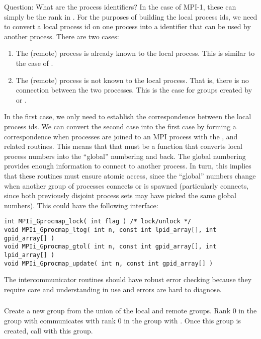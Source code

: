 \documentclass{article}
\begin{document}
Question: What are the process identifiers?  In the case of MPI-1, 
these can simply be the rank in .  For the
purposes of building the local process ids, we need to convert a local
process id on one process into a identifier that can be used by
another process.  There are two cases:
\begin{enumerate}
\item The (remote) process is already known to the local process.
This is similar to the case of .
\item The (remote) process is not known to the local process.  That
is, there is no connection between the two processes.  This is the
case for groups created by  or
. 
\end{enumerate}
In the first case, we only need to establish the correspondence
between the local process ids.  
We can convert the second case into the first case by forming a
correspondence when processes are joined to an MPI process with the
,  and related
routines.  This means that that must be a function that converts local
process numbers into the ``global'' numbering and back.  The global
numbering provides enough information to connect to another process.
In turn, this implies that these routines must ensure atomic access,
since the ``global'' numbers change when another group of processes
connects or is spawned (particularly connects, since both previously
disjoint process sets may have picked the same global numbers).
This could have the following
interface: 
\begin{verbatim}
int MPIi_Gprocmap_lock( int flag ) /* lock/unlock */
void MPIi_Gprocmap_ltog( int n, const int lpid_array[], int gpid_array[] )
void MPIi_Gprocmap_gtol( int n, const int gpid_array[], int lpid_array[] )
void MPIi_Gprocmap_update( int n, const int gpid_array[] )
\end{verbatim}

The intercommunicator routines should have robust error checking because they
require care and understanding in use and errors are hard to diagnose.  

\subsubsection{}
Create a new group from the union of the local and remote groups.  Rank 0 in
the group with  communicates with rank 0 in the group with
.  Once this group is created, call
 with this group.  
\end{document}
